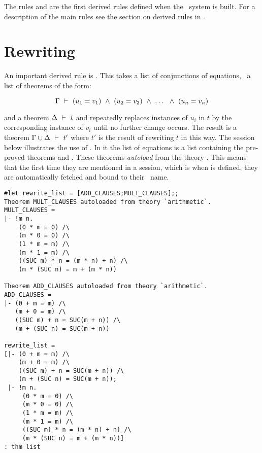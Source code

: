 The rules  and  are the first derived rules
 defined when the \HOL\ system is built. For a description
of the main rules see the section on derived rules in
\DESCRIPTION.

\section{Rewriting}

An important  derived  rule  is  .    This  takes  a  list of
conjunctions of equations, \ie\ a list of theorems of the  form:

\[ \Gamma\ \vdash\  (u_1 = v_1) \ \wedge\  (u_2 = v_2) \ \wedge\  \ldots\ \ \wedge\  (u_n  = v_n)\]

\noindent  and a theorem
$\Delta\ \vdash\  t$  and  repeatedly  replaces  instances  of  $u_i$ in  $t$ by the
corresponding instance of $v_i$ until no further change occurs.   The result is
a theorem $\Gamma\cup\Delta\ \vdash\  t'$ where $t'$ is the result  of rewriting $t$
in this way.  The session below illustrates the use of  .  In
it the list of equations is a list  containing the pre-proved
theorems   and   .     These  theorems  {\it
autoload\/} from the theory .   This  means that  the first time
they are mentioned in a session, which  is when   is defined,
they are automatically fetched and bound to their \ML\ name.

\begin{session}\begin{verbatim}
#let rewrite_list = [ADD_CLAUSES;MULT_CLAUSES];;
Theorem MULT_CLAUSES autoloaded from theory `arithmetic`.
MULT_CLAUSES =
|- !m n.
    (0 * m = 0) /\
    (m * 0 = 0) /\
    (1 * m = m) /\
    (m * 1 = m) /\
    ((SUC m) * n = (m * n) + n) /\
    (m * (SUC n) = m + (m * n))

Theorem ADD_CLAUSES autoloaded from theory `arithmetic`.
ADD_CLAUSES =
|- (0 + m = m) /\
   (m + 0 = m) /\
   ((SUC m) + n = SUC(m + n)) /\
   (m + (SUC n) = SUC(m + n))

rewrite_list =
[|- (0 + m = m) /\
    (m + 0 = m) /\
    ((SUC m) + n = SUC(m + n)) /\
    (m + (SUC n) = SUC(m + n));
 |- !m n.
     (0 * m = 0) /\
     (m * 0 = 0) /\
     (1 * m = m) /\
     (m * 1 = m) /\
     ((SUC m) * n = (m * n) + n) /\
     (m * (SUC n) = m + (m * n))]
: thm list
\end{verbatim}\end{session}

